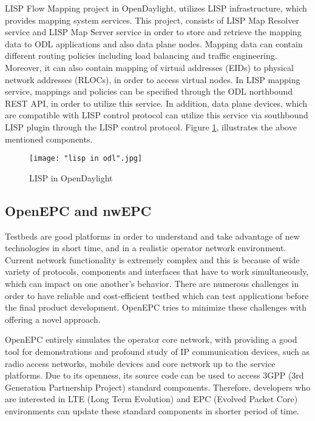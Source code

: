 \documentclass[english]{tktltiki2}
\theoremstyle{definition}
\theoremstyle{remark}
\begin{document}
LISP Flow Mapping project in OpenDaylight, utilizes LISP infrastructure, which provides mapping system services. This project, consists of LISP Map Resolver service and LISP Map Server service in order to store and retrieve the mapping data to ODL applications and  also data plane nodes. Mapping data can contain different routing policies including load balancing and traffic engineering. Moreover, it can also contain mapping of virtual addresses (EIDs) to physical network addresses (RLOCs), in order to access virtual nodes. In LISP mapping service, mappings and policies can be specified through the ODL northbound REST API, in order to utilize this service. In addition, data plane devices, which are compatible with LISP control protocol can utilize this service via southbound LISP plugin through the LISP control protocol. Figure \ref{fig:LispInODL}, illustrates the above mentioned components. 

\begin{figure}[h!t]
\centering
{}
\texttt{[image: "lisp in odl".jpg]}
\caption{LISP in OpenDaylight \cite{ODLLISP}}
\label{fig:LispInODL}
\end{figure}



\subsection{OpenEPC and nwEPC}

Testbeds are good platforms in order to understand and take advantage of new technologies in short time, and in a realistic operator network environment. Current network functionality is extremely complex and this is because of wide variety of protocols, components and interfaces that have to work simultaneously, which can impact on one another’s behavior. There are numerous challenges in order to have reliable and cost-efficient testbed which can test applications before the final product development. OpenEPC tries to minimize these challenges with offering a novel approach. \cite{OpenEPC}

OpenEPC entirely simulates the operator core network, with providing a good tool for demonstrations and profound study of IP communication devices, such as radio access networks, mobile devices and core network up to the service platforms. Due to its openness, its source code can be used to access 3GPP (3rd Generation Partnership Project) standard components. Therefore, developers who are interested in LTE (Long Term Evolution) and EPC (Evolved Packet Core) environments can update these standard components in shorter period of time. 
\end{document}
